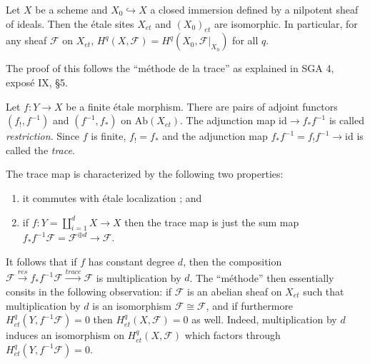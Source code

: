 \begin{proposition} 
Let $X$ be a scheme and $X_0\hookrightarrow X$ a closed immersion defined by a nilpotent sheaf of ideals. Then the \'etale sites $X_{et}$ and $(X_0)_{et}$ are isomorphic. In particular, for any sheaf $\mathcal{F}$ on $X_{et}$, $H^q(X, \mathcal{F}) = H^q(X_0, \mathcal{F}|_{X_0})$ for all $q$.
\end{proposition}


The proof of this follows the ``m\'ethode de la trace'' as explained in SGA 4, expos\'e IX, \S5. 
\begin{definition}
Let $f : Y \to X$ be a finite \'etale morphism. There are pairs of adjoint functors $(f_!,f^{-1})$ and $(f^{-1},f_*)$ on $\text{Ab}(X_{et})$. The adjunction map $\text{id} \to f_* f^{-1}$ is called \emph{restriction}. Since $f$ is finite, $f_! = f_*$ and the adjunction map $f_* f^{-1} = f_! f^{-1} \to \text{id}$ is called the \emph{trace}.  
\end{definition}

The trace map is characterized by the following two properties:
\begin{enumerate}
\item
it commutes with \'etale localization ; and
\item
if $f: Y = \coprod_{i=1}^d X \to X$ then the trace map is just the sum map $f_* f^{-1} \mathcal{F} = \mathcal{F}^{\oplus d} \to \mathcal{F}$.
\end{enumerate}

It follows that if $f$ has constant degree $d$, then the composition $\mathcal{F} \xrightarrow{res} f_* f^{-1} \mathcal{F} \xrightarrow{trace} \mathcal{F}$ is multiplication by $d$. The ``m\'ethode'' then essentially consits in the following observation: if $\mathcal{F}$ is an abelian sheaf on $X_{et}$ such that multiplication by $d$ is an isomorphism $\mathcal{F} \cong \mathcal{F}$, and if furthermore $H_{et}^q(Y,f^{-1}\mathcal{F}) = 0$ then $H_{et}^q(X,\mathcal{F}) = 0$ as well. Indeed, multiplication by $d$ induces an isomorphism on $H_{et}^q(X, \mathcal{F})$ which factors through $H_{et}^q(Y,f^{-1}\mathcal{F})= 0$.

